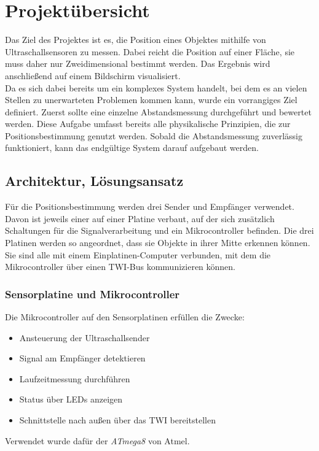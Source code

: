 


\chapter{Projektübersicht}

Das Ziel des Projektes ist es, die Position eines Objektes mithilfe von Ultraschallsensoren zu messen. Dabei reicht die Position auf einer Fläche, sie muss daher nur Zweidimensional bestimmt werden. Das Ergebnis wird anschließend auf einem Bildschirm visualisiert.\\
Da es sich dabei bereits um ein komplexes System handelt, bei dem es an vielen Stellen zu unerwarteten Problemen kommen kann, wurde ein vorrangiges Ziel definiert. Zuerst sollte eine einzelne Abstandsmessung durchgeführt und bewertet werden. Diese Aufgabe umfasst bereits alle physikalische Prinzipien, die zur Positionsbestimmung genutzt werden. Sobald die Abstandsmessung zuverlässig funktioniert, kann das endgültige System darauf aufgebaut werden.


\section{Architektur, Lösungsansatz} %
Für die Positionsbestimmung werden drei Sender und Empfänger verwendet. Davon ist jeweils einer auf einer Platine verbaut, auf der sich zusätzlich Schaltungen für die Signalverarbeitung und ein Mikrocontroller befinden. Die drei Platinen werden so angeordnet, dass sie Objekte in ihrer Mitte erkennen können. Sie sind alle mit einem Einplatinen-Computer verbunden, mit dem die Mikrocontroller über einen \ac{TWI}-Bus kommunizieren können.\\

\subsection{Sensorplatine und Mikrocontroller}
Die Mikrocontroller auf den Sensorplatinen erfüllen die Zwecke:
\begin{itemize}
	\item Ansteuerung der Ultraschallsender
	\item Signal am Empfänger detektieren
	\item Laufzeitmessung durchführen
	\item Status über \ac{LED}s anzeigen
	\item Schnittstelle nach außen über das \ac{TWI} bereitstellen
\end{itemize}
Verwendet wurde dafür der \textit{ATmega8} von Atmel.  %


